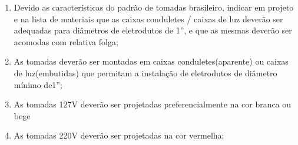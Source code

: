 \begin{enumerate}
	\item Devido as características do padrão de tomadas brasileiro, indicar em projeto e na lista de materiais que as caixas conduletes / caixas de luz deverão ser adequadas para diâmetros de eletrodutos de 1”, e que as mesmas deverão ser acomodas com relativa folga;
	
	\item As tomadas deverão ser montadas em caixas conduletes(aparente) ou caixas de luz(embutidas) que permitam a instalação de eletrodutos de diâmetro mínimo de1”;
	
	\item As tomadas 127V deverão ser projetadas preferencialmente na cor branca ou bege
	
	\item As tomadas 220V deverão ser projetadas na cor vermelha;
	

\end{enumerate}
